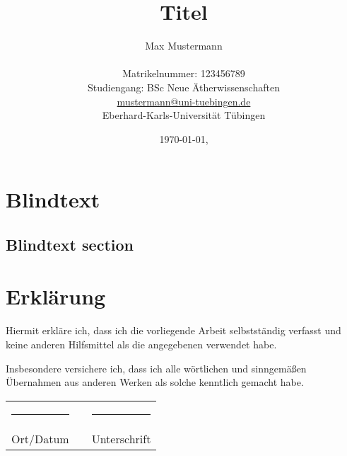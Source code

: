 \documentclass[
  11pt,
  bibliography=totoc,
  numbers=noenddot,
  ]{scrbook}
\title{Titel}
\author{{\LARGE Max Mustermann} \\
		\\
		Matrikelnummer: 123456789\\
		Studiengang: BSc Neue Ätherwissenschaften \\
		\url{mustermann@uni-tuebingen.de}\\ 
		Eberhard-Karls-Universität Tübingen\\}
\date{\ddmmyyyydate\today, \currenttime}
\begin{document}
\maketitle
\frontmatter
\tableofcontents
\mainmatter 



\chapter{Blindtext}

\lipsum

\section{Blindtext section}

\lipsum


\insertBib

\chapter*{Erklärung}

Hiermit erkläre ich, dass ich die vorliegende Arbeit selbstständig verfasst und keine anderen Hilfsmittel als die angegebenen verwendet habe.

Insbesondere versichere ich, dass ich alle wörtlichen und sinngemäßen Übernahmen aus anderen Werken als solche kenntlich gemacht habe.

\vspace{10ex}

\noindent
\begin{tabular}{lcl}
\rule{6cm}{1pt} & \hspace{1cm} & \rule{6cm}{1pt} \\
Ort/Datum & & Unterschrift
\end{tabular}
\end{document}
